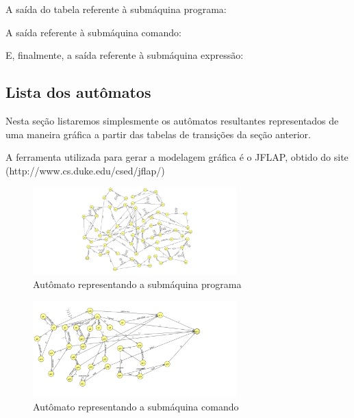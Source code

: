 \documentclass[12pt,oneside,a4paper,english]{abntex2}
\begin{document}
      A saída do tabela referente à submáquina programa:

      


      A saída referente à submáquina comando:

      

      
      E, finalmente, a saída referente à submáquina expressão:

      

    \subsection{Lista dos autômatos}

      Nesta seção listaremos simplesmente os autômatos resultantes representados de uma maneira gráfica a partir das tabelas de transições da seção anterior.


      A ferramenta utilizada para gerar a modelagem gráfica é o JFLAP, obtido do site (http://www.cs.duke.edu/csed/jflap/)


      \begin{figure}[H]
        \caption{Autômato representando a submáquina programa}
        \centering
          \includegraphics[width=0.7\textwidth]{../1-linguagem/notacoes/JFLAP/programa/programa.png}
      \end{figure}

      \begin{figure}[H]
        \caption{Autômato representando a submáquina comando}
        \centering
          \includegraphics[width=0.7\textwidth]{../1-linguagem/notacoes/JFLAP/comando/comando.png}
      \end{figure}
\end{document}
